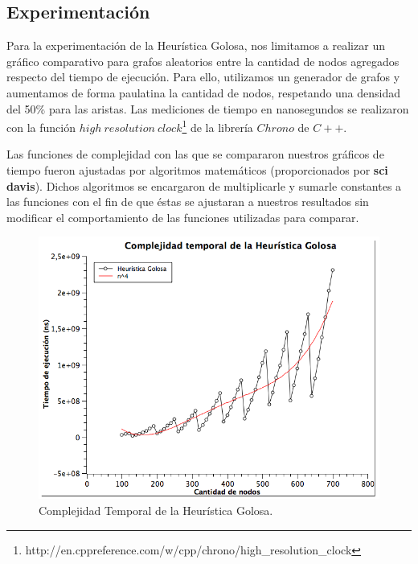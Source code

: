 \subsection{Experimentación}
Para la experimentación de la Heurística Golosa, nos limitamos a realizar un gráfico comparativo para grafos aleatorios entre la cantidad de nodos agregados respecto del tiempo de ejecución. Para ello, utilizamos un generador de grafos y aumentamos de forma paulatina la cantidad de nodos, respetando una densidad del 50\% para las aristas.\newline
Las mediciones de tiempo en nanosegundos se realizaron con la función $high\ resolution\ clock$\footnote{http://en.cppreference.com/w/cpp/chrono/high\_resolution\_clock} de la librería $Chrono$ de $C++$. 

Las funciones de complejidad con las que se compararon nuestros gráficos de tiempo fueron ajustadas por algoritmos matemáticos (proporcionados por \textbf{sci davis}). Dichos algoritmos se encargaron de multiplicarle y sumarle constantes a las funciones con el fin de que éstas se ajustaran a nuestros resultados sin modificar el comportamiento de las funciones utilizadas para comparar.

\begin{figure}[H] %
\begin{center}
\includegraphics[width=350pt]{../imgs/complejidad_goloso.png}
\caption{Complejidad Temporal de la Heurística Golosa.}
\end{center}
\end{figure}

